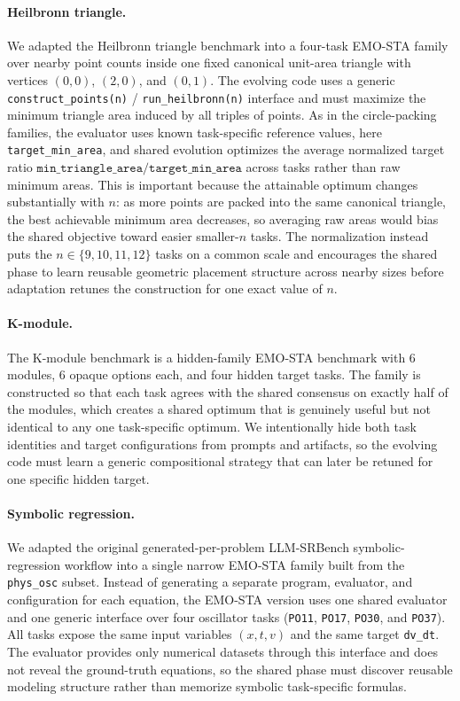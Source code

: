 \paragraph{Heilbronn triangle.}
We adapted the Heilbronn triangle benchmark into a four-task EMO-STA family over nearby point counts inside one fixed canonical unit-area triangle with vertices \((0,0)\), \((2,0)\), and \((0,1)\). The evolving code uses a generic \texttt{construct\_points(n)} / \texttt{run\_heilbronn(n)} interface and must maximize the minimum triangle area induced by all triples of points. As in the circle-packing families, the evaluator uses known task-specific reference values, here \texttt{target\_min\_area}, and shared evolution optimizes the average normalized target ratio \(\texttt{min\_triangle\_area} / \texttt{target\_min\_area}\) across tasks rather than raw minimum areas. This is important because the attainable optimum changes substantially with \(n\): as more points are packed into the same canonical triangle, the best achievable minimum area decreases, so averaging raw areas would bias the shared objective toward easier smaller-\(n\) tasks. The normalization instead puts the \(n \in \{9, 10, 11, 12\}\) tasks on a common scale and encourages the shared phase to learn reusable geometric placement structure across nearby sizes before adaptation retunes the construction for one exact value of \(n\).

\paragraph{K-module.}
The K-module benchmark is a hidden-family EMO-STA benchmark with 6 modules, 6 opaque options each, and four hidden target tasks. The family is constructed so that each task agrees with the shared consensus on exactly half of the modules, which creates a shared optimum that is genuinely useful but not identical to any one task-specific optimum. We intentionally hide both task identities and target configurations from prompts and artifacts, so the evolving code must learn a generic compositional strategy that can later be retuned for one specific hidden target.

\paragraph{Symbolic regression.}
We adapted the original generated-per-problem LLM-SRBench symbolic-regression workflow into a single narrow EMO-STA family built from the \texttt{phys\_osc} subset. Instead of generating a separate program, evaluator, and configuration for each equation, the EMO-STA version uses one shared evaluator and one generic interface over four oscillator tasks (\texttt{PO11}, \texttt{PO17}, \texttt{PO30}, and \texttt{PO37}). All tasks expose the same input variables \((x, t, v)\) and the same target \texttt{dv\_dt}. The evaluator provides only numerical datasets through this interface and does not reveal the ground-truth equations, so the shared phase must discover reusable modeling structure rather than memorize symbolic task-specific formulas.

